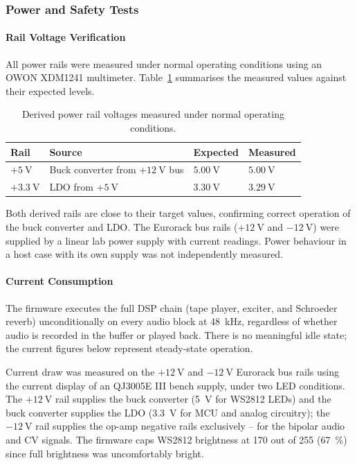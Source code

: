 \subsubsection{Power and Safety Tests}

\paragraph{Rail Voltage Verification}

All power rails were measured under normal operating conditions using an OWON XDM1241 multimeter.
Table~\ref{tab:rail-voltages} summarises the measured values against their expected levels.

\begin{table}[H]
    \centering
    \begin{tabular}{llll}
        \toprule
        \textbf{Rail} & \textbf{Source} & \textbf{Expected} & \textbf{Measured} \\
        \midrule
        $+\SI{5}{\volt}$   & Buck converter from $+\SI{12}{\volt}$ bus & $\SI{5.00}{\volt}$ & $\SI{5.00}{\volt}$ \\
        $+\SI{3.3}{\volt}$ & LDO from $+\SI{5}{\volt}$                 & $\SI{3.30}{\volt}$ & $\SI{3.29}{\volt}$ \\
        \bottomrule
    \end{tabular}
    \caption{Derived power rail voltages measured under normal operating conditions.}
    \label{tab:rail-voltages}
\end{table}

Both derived rails are close to their target values, confirming correct operation of the buck converter and LDO.
The Eurorack bus rails ($+\SI{12}{\volt}$ and $-\SI{12}{\volt}$) were supplied by a linear lab power supply with current readings. 
Power behaviour in a host case with its own supply was not independently measured.

\paragraph{Current Consumption}

The firmware executes the full DSP chain (tape player, exciter, and Schroeder reverb) unconditionally on every audio block at \qty{48}{\kilo\hertz}, regardless of whether audio is recorded in the buffer or played back.
There is no meaningful idle state; the current figures below represent steady-state operation.

Current draw was measured on the $+\SI{12}{\volt}$ and $-\SI{12}{\volt}$ Eurorack bus rails using the current display of an QJ3005E III bench supply, under two LED conditions.
The $+\SI{12}{\volt}$ rail supplies the buck converter (\qty{5}{\volt} for WS2812 LEDs) and the buck converter supplies the LDO (\qty{3.3}{\volt} for MCU and analog circuitry); the $-\SI{12}{\volt}$ rail supplies the op-amp negative rails exclusively -- for the bipolar audio and CV signals.
The firmware caps WS2812 brightness at 170 out of 255 (\qty{67}{\percent}) since full brightness was uncomfortably bright.

